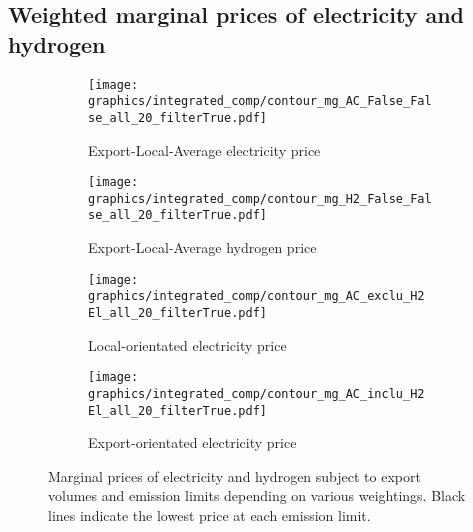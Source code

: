 \subsection{Weighted marginal prices of electricity and hydrogen}

\begin{figure*}[h] %
    \centering
    \begin{subfigure}[b]{0.45\linewidth}
        \centering
        \texttt{[image: graphics/integrated\_comp/contour\_mg\_AC\_False\_False\_all\_20\_filterTrue.pdf]}
        \caption{Export-Local-Average electricity price}
        \label{fig:export_local_el_price}
    \end{subfigure}
    \hfill
    \begin{subfigure}[b]{0.45\linewidth}
        \centering
        \texttt{[image: graphics/integrated\_comp/contour\_mg\_H2\_False\_False\_all\_20\_filterTrue.pdf]}
        \caption{Export-Local-Average hydrogen price}
        \label{fig:export_local_hy_price}
    \end{subfigure}
    \hfill
    \begin{subfigure}[b]{0.45\linewidth}
        \centering
        \texttt{[image: graphics/integrated\_comp/contour\_mg\_AC\_exclu\_H2 El\_all\_20\_filterTrue.pdf]}
        \caption{Local-orientated electricity price}
        \label{fig:local_el_price_appendix}
    \end{subfigure}
    \hfill
    \begin{subfigure}[b]{0.45\linewidth}
        \centering
        \texttt{[image: graphics/integrated\_comp/contour\_mg\_AC\_inclu\_H2 El\_all\_20\_filterTrue.pdf]}
        \caption{Export-orientated electricity price}
        \label{fig:export_el_price}
    \end{subfigure}
    \hfill

    \caption{Marginal prices of electricity and hydrogen subject to export volumes and emission limits depending on various weightings. Black lines indicate the lowest price at each emission limit.}
    \label{fig:prices_all}
\end{figure*}

\clearpage